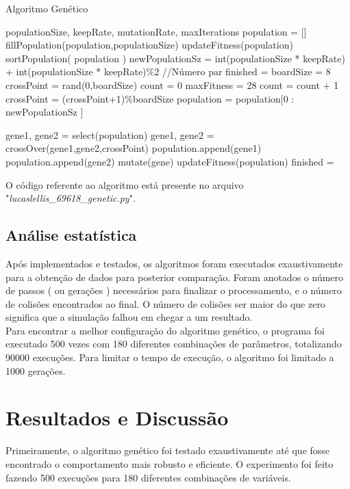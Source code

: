 \documentclass[conference]{IEEEtran}
\begin{document}
	\begin{algorithm}
		\caption{Algoritmo Genético}
		\begin{algorithmic}[1]
			\REQUIRE populationSize, keepRate, mutationRate, maxIterations
			\STATE population = []
			\STATE fillPopulation(population,populationSize)
			\STATE updateFitness(population)
			\STATE sortPopulation( population )
			\STATE newPopulationSz = int(populationSize * keepRate) + int(populationSize * keepRate)\%2 //Número par
			\STATE finished = \FALSE
			\STATE boardSize = 8
			\STATE crossPoint = rand(0,boardSize)
			\STATE count = 0
			\STATE maxFitness = 28
			\STATE count = count + 1
			\STATE crossPoint = (crossPoint+1)\%boardSize
			population = population[0 : newPopulationSz ]
			
			\STATE gene1, gene2 = select(population)
			\STATE gene1, gene2 = crossOver(gene1,gene2,crossPoint)
			\STATE population.append(gene1)
			\STATE population.append(gene2)
			\ENDWHILE
			\STATE mutate(gene)
			\ENDIF
			\ENDFOR
			\STATE updateFitness(population)
			\STATE finished = \TRUE 
			\ENDIF
			\ENDWHILE
		\end{algorithmic} 
	\end{algorithm}
	O código referente ao algoritmo está presente no arquivo "\textit{lucaslellis\_69618\_genetic.py}".
	
	\subsection{Análise estatística}
	Após implementados e testados, os algoritmos foram executados exaustivamente para a obtenção de dados para posterior
	comparação. Foram anotados o número de passos ( ou gerações ) necessários para finalizar o processamento, e o número de
	colisões encontrados ao final. O número de colisões ser maior do que zero significa que a simulação falhou em chegar a um
	resultado.\\
	Para encontrar a melhor configuração do algoritmo genético, o programa foi executado 500 vezes com 180 diferentes
	combinações de parâmetros, totalizando 90000 execuções. Para limitar o tempo de execução, o algoritmo foi limitado a 1000 gerações.
	
	\section{Resultados e Discussão}
	Primeiramente, o algoritmo genético foi testado exaustivamente até que fosse encontrado o comportamento mais robusto e eficiente. O experimento foi feito fazendo 500 execuções para 180 diferentes combinações de variáveis.
	
\end{document}
